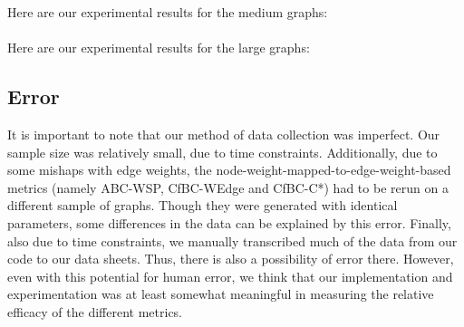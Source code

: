 \documentclass{article}
\begin{document}
Here are our experimental results for the medium graphs:\\
 \\

Here are our experimental results for the large graphs:\\

\subsection{Error}
It is important to note that our method of data collection was imperfect. Our sample size was relatively small, due to time constraints. Additionally, due to some mishaps with edge weights, the node-weight-mapped-to-edge-weight-based metrics (namely ABC-WSP, CfBC-WEdge and CfBC-C*) had to be rerun on a different sample of graphs. Though they were generated with identical parameters, some differences in the data can be explained by this error.
Finally, also due to time constraints, we manually transcribed much of the data from our code to our data sheets. Thus, there is also a possibility of error there. However, even with this potential for human error, we think that our implementation and experimentation was at least somewhat meaningful in measuring the relative efficacy of the different metrics.
\end{document}
